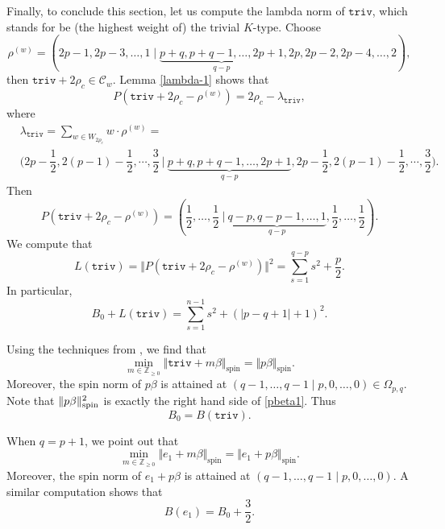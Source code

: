 \documentclass[11pt]{amsart}
\theoremstyle{plain}
\theoremstyle{definition}
\newcommand{\bbZ}{\mathbb{Z}}
\begin{document}
Finally, to conclude this section, let us compute the lambda norm of $\texttt{triv}$, which stands for be (the highest weight of) the trivial $K$-type. Choose
 $$
 \rho^{(w)}=(2p-1, 2p-3, \dots, 1\mid \underbrace{p+q, p+q-1, \dots, 2p+1}_{q-p}, 2p, 2p-2, 2p-4, \dots, 2),
 $$
 then $\texttt{triv}+2\rho_c\in \mathcal{C}_w$. Lemma \ref{lambda-1} shows that
 \[P(\texttt{triv}+2\rho_c-\rho^{(w)})=2\rho_c-\lambda_{\texttt{triv}},\]
 where
 	\begin{align*}
 	&\lambda_{\texttt{triv}}=\sum_{w\in W_{2\rho_c}}w\cdot\rho^{(w)}=\\
 	&\bigg(2p-\dfrac{1}{2},2(p-1)-\dfrac{1}{2},\cdots,\dfrac{3}{2}\ \bigg|\  \underbrace{p+q,p+q-1,\dots,2p+1}_{q-p},2p-\dfrac{1}{2},2(p-1)-\dfrac{1}{2},\cdots,\dfrac{3}{2}\bigg).
 \end{align*}
 Then
 \[P(\texttt{triv}+2\rho_c-\rho^{(w)})=\left(\dfrac{1}{2},\dots,\dfrac{1}{2}\ \bigg|\  \underbrace{q-p,q-p-1,\dots,1}_{q-p},\dfrac{1}{2},\dots,\dfrac{1}{2}\right).\]
 We compute that
 \begin{equation}\label{P0}
 	L(\texttt{triv})=\Vert P(\texttt{triv}+2\rho_c-\rho^{(w)})\Vert^2=\sum_{s=1}^{q-p}s^2+\dfrac{p}{2}.
 \end{equation}
In particular,
\begin{equation}\label{pbeta1}
	B_0+L(\texttt{triv})=\sum_{s=1}^{n-1}s^2+(|p-q+1|+1)^2.
\end{equation}

Using the techniques from \cite{DY},  we  find that
 $$
 \min_{m\in\bbZ_{\ge 0}}\Vert \texttt{triv}+m\beta\Vert_{\mathrm{spin}}=\Vert p\beta\Vert_{\mathrm{spin}}.
 $$
Moreover, the spin norm of $p\beta$ is attained at $(q-1, \dots, q-1 \mid p, 0, \dots, 0)\in\Omega_{p, q}$. Note that  $\|p\beta\|_{\rm spin}^2$ is exactly the right hand side of \eqref{pbeta1}. Thus
\begin{equation}\label{B0-explanation}
B_0=B(\texttt{triv}).
\end{equation}

 When $q=p+1$, we point out that
 $$
 \min_{m\in\bbZ_{\ge 0}}\Vert e_1+m\beta\Vert_{\mathrm{spin}}=\Vert e_1+p\beta\Vert_{\mathrm{spin}}.
 $$
Moreover, the spin norm of $e_1+p\beta$ is attained at $(q-1,\dots,q-1\mid p,0,\dots,0)$. A similar computation shows that
 \[B(e_1)=B_0+\dfrac{3}{2}.\]
\end{document}
